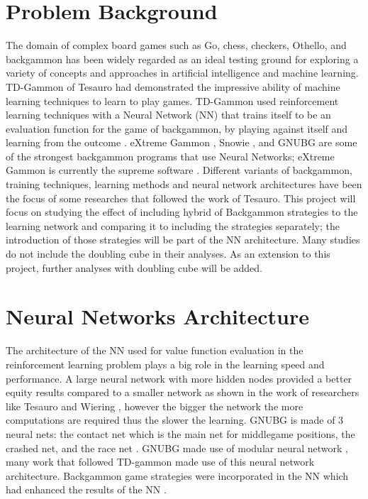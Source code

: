 \documentclass[12pt,a4paper]{article}
\begin{document}
\section*{Problem Background}
The domain of complex board games such as Go, chess, checkers, Othello, and backgammon has been widely regarded as an ideal testing ground for exploring a variety of concepts and approaches in artificial intelligence and machine learning. TD-Gammon  of Tesauro \cite{DBLP:conf/icml/Tesauro92,DBLP:journals/ai/Tesauro02} had demonstrated the impressive ability of machine learning techniques to learn to play games. TD-Gammon used reinforcement learning techniques with a Neural Network (NN) that trains itself to be an evaluation function for the game of backgammon, by playing against itself and learning from the outcome \cite{DBLP:journals/ai/Tesauro02}. eXtreme Gammon \cite{exg}, Snowie \cite{snowie}, and GNUBG \cite{gnubg} are some of the strongest backgammon programs that use Neural Networks; eXtreme Gammon is currently the supreme software \cite{MichaelDepreliStudy2012}. Different variants of backgammon\cite{DBLP:conf/evoW/PapahristouR11,DBLP:conf/ifip12/PapahristouR12}, training techniques, learning methods and neural network architectures have been the focus of some researches that followed the work of Tesauro. This project will focus on studying the effect of including hybrid of Backgammon strategies to the learning network and comparing it to including the strategies separately; the introduction of those strategies will be part of the NN architecture. Many studies do not include the doubling cube in their analyses. As an extension to this project, further analyses with doubling cube will be added.

\section*{Neural Networks Architecture}
The architecture of the NN used for value function evaluation in the reinforcement learning problem plays a big role in the learning speed and performance. A large neural network with more hidden nodes provided a better equity results compared to a smaller network as shown in the work of researchers like Tesauro \cite{DBLP:journals/ai/Tesauro02} and Wiering \cite{DBLP:journals/jilsa/Wiering10}, however the bigger the network the more computations are required thus the slower the learning. GNUBG is made of 3 neural nets: the contact net which is the main net for middlegame positions, the crashed net, and the race net \cite{gnubg}. GNUBG made use of modular neural network \cite{modularNeuralNetwork}, many work that followed TD-gammon made use of this neural network architecture. Backgammon game strategies were incorporated in the NN which had enhanced the results of the NN \cite{DBLP:journals/jilsa/Wiering10,modularNeuralNetwork,gnubg}. 
\end{document}
